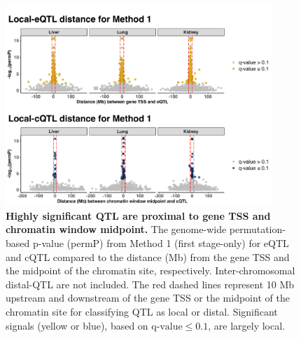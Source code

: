 \documentclass[9pt,twocolumn,twoside]{gsajnl}
\begin{document}
\begin{figure}[hp]
\renewcommand{\familydefault}{\sfdefault}\normalfont
\centering
\includegraphics[width=0.9\textwidth]{figs/qtl_distance_method1.pdf}
\caption{\textbf{Highly significant QTL are proximal to gene TSS and chromatin window midpoint.} The genome-wide permutation-based p-value (permP) from Method 1 (first stage-only) for eQTL and cQTL compared to the distance (Mb) from the gene TSS and the midpoint of the chromatin site, respectively. Inter-chromosomal distal-QTL are not included. The red dashed lines represent 10 Mb upstream and downstream of the gene TSS or the midpoint of the chromatin site for classifying QTL as local or distal. Significant signals (yellow or blue), based on $\text{q-value} \le 0.1$, are largely local. \label{fig:genomewide_dist}}
\end{figure}

\clearpage
\end{document}

